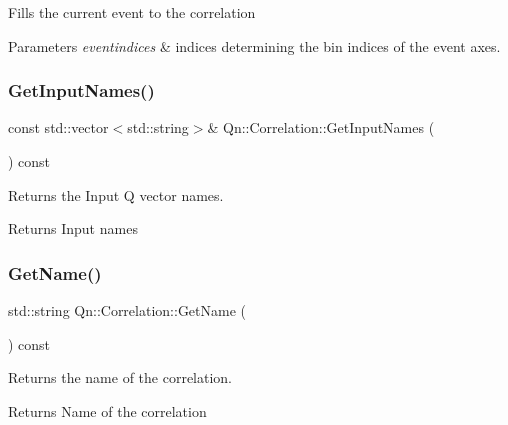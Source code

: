 Fills the current event to the correlation 
\begin{DoxyParams}{Parameters}
{\em eventindices} & indices determining the bin indices of the event axes. \\
\hline
\end{DoxyParams}
\mbox{\label{classQn_1_1Correlation_a8cfb95a94185bf9d816b068973123bc8}} 
\subsubsection{\texorpdfstring{Get\+Input\+Names()}{GetInputNames()}}
{\footnotesize\ttfamily const std\+::vector$<$std\+::string$>$\& Qn\+::\+Correlation\+::\+Get\+Input\+Names (\begin{DoxyParamCaption}{ }\end{DoxyParamCaption}) const\hspace{0.3cm}{\ttfamily [inline]}}

Returns the Input Q vector names. \begin{DoxyReturn}{Returns}
Input names 
\end{DoxyReturn}
\mbox{\label{classQn_1_1Correlation_a6b24af1a3d28b9f60ce03277192a3cc4}} 
\subsubsection{\texorpdfstring{Get\+Name()}{GetName()}}
{\footnotesize\ttfamily std\+::string Qn\+::\+Correlation\+::\+Get\+Name (\begin{DoxyParamCaption}{ }\end{DoxyParamCaption}) const\hspace{0.3cm}{\ttfamily [inline]}}

Returns the name of the correlation. \begin{DoxyReturn}{Returns}
Name of the correlation 
\end{DoxyReturn}
\mbox{\label{classQn_1_1Correlation_a09105a0c076d62b3e3073bf43986da57}} 

